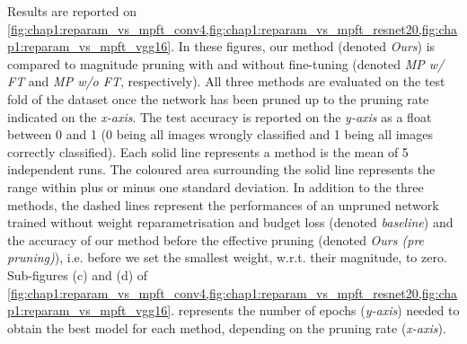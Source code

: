 Results are reported on
\cref{fig:chap1:reparam_vs_mpft_conv4,fig:chap1:reparam_vs_mpft_resnet20,fig:chap1:reparam_vs_mpft_vgg16}.
In these figures, our method (denoted \emph{Ours}) is compared to magnitude
pruning with and without fine-tuning (denoted \emph{MP w/ FT} and \emph{MP w/o
FT}, respectively). All three methods are evaluated on the test fold of the
dataset once the network has been pruned up to the pruning rate indicated on the
\emph{x-axis}. The test accuracy is reported on the \emph{y-axis} as a float
between 0 and 1 (0 being all images wrongly classified and 1 being all images
correctly classified). Each solid line represents a method is the mean of 5
independent runs. The coloured area surrounding the solid line represents the
range within plus or minus one standard deviation. In addition to the three
methods, the dashed lines represent the performances of an unpruned network
trained without weight reparametrisation and budget loss (denoted
\emph{baseline}) and the accuracy of our method before the effective pruning
(denoted \emph{Ours (pre pruning)}), i.e. before we set the smallest weight,
w.r.t. their magnitude, to zero. Sub-figures (c) and (d) of
\cref{fig:chap1:reparam_vs_mpft_conv4,fig:chap1:reparam_vs_mpft_resnet20,fig:chap1:reparam_vs_mpft_vgg16}.
represents the number of epochs (\emph{y-axis}) needed to obtain the best model
for each method, depending on the pruning rate (\emph{x-axis}).\\


